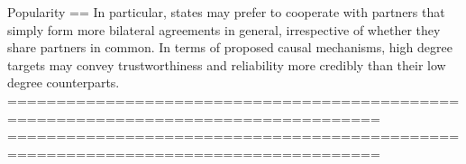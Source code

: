 
Popularity
==
In particular, states may prefer to cooperate with partners that simply form more bilateral agreements in general, irrespective of whether they share partners in common. In terms of proposed causal mechanisms, high degree targets may convey trustworthiness and reliability more credibly than their low degree counterparts. 
====================================================================================
====================================================================================